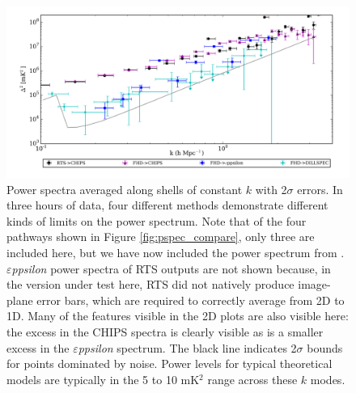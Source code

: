 \documentclass[twolcolumn,iop]{emulateapj}
\def\eppsilon{{\it $\varepsilon$ppsilon}}
\def\dilloncite{\cite{PhysRevD.91.123011} }
\begin{document}
\begin{figure}[htbp]

\includegraphics[width=\textwidth]{figures/MWA_PS_Compare/MWAPipeline_compare_1d_radial_logbryna.png}
\caption{Power spectra averaged along shells of constant $k$ with 2$\sigma$ errors. In three hours of data, four different methods demonstrate different kinds of limits on the power spectrum. Note that of the four pathways shown in Figure \ref{fig:pspec_compare}, only three are included here, but we have now included the power spectrum from \dilloncite{}.  \eppsilon{} power spectra of RTS outputs are not shown because, in the version under test here, RTS did not natively produce image-plane error bars, which are required to correctly average from 2D to 1D. Many of the features visible in the 2D plots are also visible here: the excess in the CHIPS spectra is clearly visible as is a smaller excess in the \eppsilon{} spectrum.  The black line indicates 2$\sigma$ bounds for points dominated by noise.  Power levels for typical theoretical models are typically in the 5 to 10 mK$^2$ range across these $k$ modes.
\label{fig:1D_pspecs}}

\end{figure}
\end{document}
